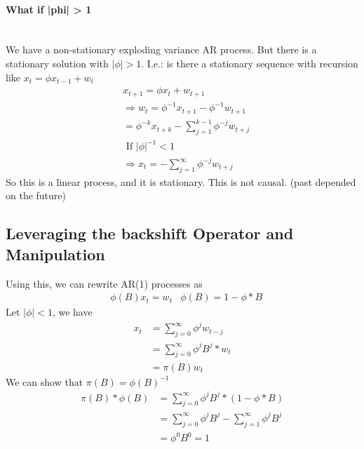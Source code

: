 \paragraph{What if |phi| > 1}\mbox{}\\
We have a non-stationary exploding variance AR process. But there is a stationary solution with $|\phi|>1$. I.e.: is there a stationary sequence with recursion like $x_t = \phi x_{t-1} + w_t$
    \begin{align*}
        & x_{t+1} = \phi x_t + w_{t+1}\\
        & \Longrightarrow w_t = \phi^{-1}x_{t+1} - \phi^{-1} w_{t+1}\\
        & = \phi^{-k} x_{t+k} - \sum_{j=1}^{k-1} \phi^{-j} w_{t+j}\\
        & \textrm{ If $|\phi|^{-1} < 1$} \\
        & \Longrightarrow x_t = -\sum_{j=1}^\infty \phi^{-j} w_{t+j}
    \end{align*}
So this is a linear process, and it is stationary. This is not causal. (past depended on the future) 



\subsection{Leveraging the backshift Operator and Manipulation}
Using this, we can rewrite AR(1) processes as 
    \begin{align*}
        & \phi(B)x_t = w_t
        & \phi(B) = 1 - \phi*B
    \end{align*}
Let $|\phi|<1$, we have 
    \begin{align*}
        x_t 
        & = \sum_{j=0}^\infty \phi^j w_{t-j}\\
        & = \sum_{j=0}^\infty \phi^j B^j * w_t\\
        & = \pi(B) w_t
    \end{align*}
We can show that $ \pi(B) = \phi(B)^{-1}$
    \begin{align*}
        \pi(B) * \phi(B) 
        & = \sum_{j=0}^\infty \phi^j B^j * (1-\phi*B) \\
        & =  \sum_{j=0}^\infty \phi^j B^j-\sum_{j=1}^\infty \phi^j B^j\\
        & = \phi^0 B^0 = 1
    \end{align*}



